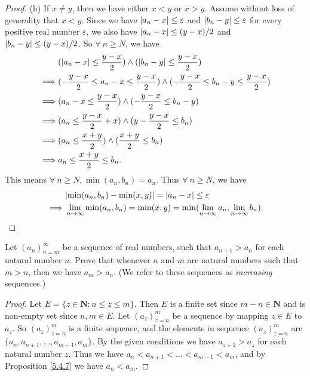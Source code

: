 \begin{proof}{(h)}
    If \(x \neq y\), then we have either \(x < y\) or \(x > y\).
    Assume without loss of generality that \(x < y\).
    Since we have \(\abs*{a_n - x} \leq \varepsilon\) and \(\abs*{b_n - y} \leq \varepsilon\) for every positive real number \(\varepsilon\), we also have \(\abs*{a_n - x} \leq (y - x) / 2\) and \(\abs*{b_n - y} \leq (y - x) / 2\).
    So \(\forall\ n \geq N\), we have
    \begin{align*}
                 & (\abs*{a_n - x} \leq \frac{y - x}{2}) \land (\abs*{b_n - y} \leq \frac{y - x}{2})                               \\
        \implies & (-\frac{y - x}{2} \leq a_n - x \leq \frac{y - x}{2}) \land (-\frac{y - x}{2} \leq b_n - y \leq \frac{y - x}{2}) \\
        \implies & (a_n - x \leq \frac{y - x}{2}) \land (-\frac{y - x}{2} \leq b_n - y)                                            \\
        \implies & (a_n \leq \frac{y - x}{2} + x) \land (y - \frac{y - x}{2} \leq b_n)                                             \\
        \implies & (a_n \leq \frac{x + y}{2}) \land (\frac{x + y}{2} \leq b_n)                                                     \\
        \implies & a_n \leq \frac{x + y}{2} \leq b_n.
    \end{align*}
    This means \(\forall\ n \geq N, \min(a_n, b_n) = a_n\).
    Thus \(\forall\ n \geq N\), we have
    \begin{align*}
                 & \abs*{\min(a_n, b_n) - \min(x, y)} = \abs*{a_n - x} \leq \varepsilon                                      \\
        \implies & \lim_{n \to \infty} \min(a_n, b_n) = \min(x, y) = \min(\lim_{n \to \infty} a_n, \lim_{n \to \infty} b_n).
    \end{align*}
\end{proof}

\exercisesection

\begin{exercise}\label{ex 6.1.1}
    Let \((a_n)_{n = m}^\infty\) be a sequence of real numbers, such that \(a_{n + 1} > a_n\) for each natural number \(n\).
    Prove that whenever \(n\) and \(m\) are natural numbers such that \(m > n\), then we have \(a_m > a_n\).
    (We refer to these sequences as \emph{increasing} sequences.)
\end{exercise}

\begin{proof}
    Let \(E = \{z \in \mathbf{N} : n \leq z \leq m\}\).
    Then \(E\) is a finite set since \(m - n \in \mathbf{N}\) and is non-empty set since \(n, m \in E\).
    Let \((a_z)_{z = n}^m\) be a sequence by mapping \(z \in E\) to \(a_z\).
    So \((a_z)_{z = n}^m\) is a finite sequence, and the elements in sequence \((a_z)_{z = n}^m\) are \(\{a_n, a_{n + 1}, \dots, a_{m - 1}, a_m\}\).
    By the given conditions we have \(a_{z + 1} > a_z\) for each natural number \(z\).
    Thus we have \(a_n < a_{n + 1} < \dots < a_{m - 1} < a_m\), and by Proposition \ref{5.4.7} we have \(a_n < a_m\).
\end{proof}

